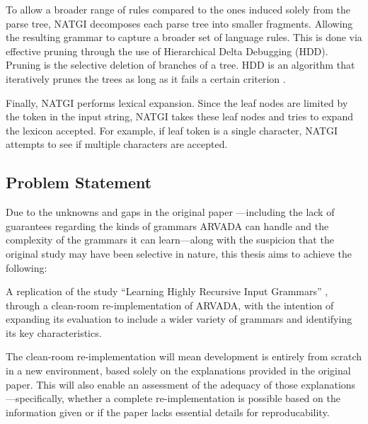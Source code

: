 \vspace{\baselineskip}
To allow a broader range of rules compared to the ones induced solely from the parse tree, NATGI decomposes each parse tree into smaller fragments. Allowing the resulting grammar to capture a broader set of language rules. This is done via effective pruning through the use of Hierarchical Delta Debugging (HDD). Pruning is the selective deletion of branches of a tree. HDD is an algorithm that iteratively prunes the trees as long as it fails a certain criterion \cite{misherghiHDDHierarchicalDelta2006a}. 

\vspace{\baselineskip}
Finally, NATGI performs lexical expansion. Since the leaf nodes are limited by the token in the input string, NATGI takes these leaf nodes and tries to expand the lexicon accepted. For example, if leaf token is a single character, NATGI attempts to see if multiple characters are accepted.


\subsection{Problem Statement}

Due to the unknowns and gaps in the original paper \cite{kulkarniLearningHighlyRecursive2021}—including the lack of guarantees regarding the kinds of grammars ARVADA can handle and the complexity of the grammars it can learn—along with the suspicion that the original study may have been selective in nature, this thesis aims to achieve the following:

\vspace{\baselineskip}
A replication of the study “Learning Highly Recursive Input Grammars” \cite{kulkarniLearningHighlyRecursive2021}, through a clean-room re-implementation of ARVADA, with the intention of expanding its evaluation to include a wider variety of grammars and identifying its key characteristics.

\vspace{\baselineskip}
The clean-room re-implementation will mean development is entirely from scratch in a new environment, based solely on the explanations provided in the original paper. This will also enable an assessment of the adequacy of those explanations—specifically, whether a complete re-implementation is possible based on the information given or if the paper lacks essential details for reproducability.

